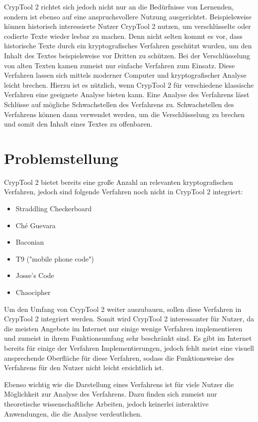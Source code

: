 \documentclass[fontsize=11pt, paper=a4, parskip=half]{scrartcl}
\begin{document}
CrypTool 2 richtet sich jedoch nicht nur an die Bedürfnisse von Lernenden, sondern ist ebenso auf eine anspruchsvollere Nutzung ausgerichtet. Beispielsweise können historisch interessierte Nutzer CrypTool 2 nutzen, um verschlüsselte oder codierte Texte wieder lesbar zu machen. Denn nicht selten kommt es vor, dass historische Texte durch ein kryptografisches Verfahren geschützt wurden, um den Inhalt des Textes beispielsweise vor Dritten zu schützen. Bei der Verschlüsselung von alten Texten kamen zumeist nur einfache Verfahren zum Einsatz. Diese Verfahren lassen sich mittels moderner Computer und kryptografischer Analyse leicht brechen. Hierzu ist es nützlich, wenn CrypTool 2 für verschiedene klassische Verfahren eine geeignete Analyse bieten kann. Eine Analyse des Verfahrens lässt Schlüsse auf mögliche Schwachstellen des Verfahrens zu. Schwachstellen des Verfahrens können dann verwendet werden, um die Verschlüsselung zu brechen und somit den Inhalt eines Textes zu offenbaren.

\section{Problemstellung}
CrypTool 2 bietet bereits eine große Anzahl an relevanten kryptografischen Verfahren, jedoch sind folgende Verfahren noch nicht in CrypTool 2 integriert:
\begin{itemize}
	\item{Straddling Checkerboard} 
	\item{Ché Guevara}
	\item{Baconian} 
	\item{T9 ("mobile phone code")}
	\item{Josse's Code}
	\item{Chaocipher} 
\end{itemize}

Um den Umfang von CrypTool 2 weiter auszubauen, sollen diese Verfahren in CrypTool 2 integriert werden. Somit wird CrypTool 2 interessanter für Nutzer, da die meisten Angebote im Internet nur einige wenige Verfahren implementieren und zumeist in ihrem Funktionsumfang sehr beschränkt sind. Es gibt im Internet bereits für einige der Verfahren Implementierungen, jedoch fehlt meist eine visuell ansprechende Oberfläche für diese Verfahren, sodass die Funktionsweise des Verfahrens für den Nutzer nicht leicht ersichtlich ist.

Ebenso wichtig wie die Darstellung eines Verfahrens ist für viele Nutzer die Möglichkeit zur Analyse des Verfahrens. Dazu finden sich zumeist nur theoretische wissenschaftliche Arbeiten, jedoch keinerlei interaktive Anwendungen, die die Analyse verdeutlichen.
\end{document}
